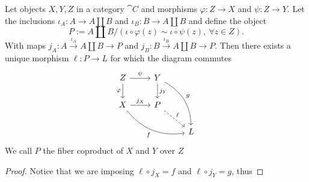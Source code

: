 \begin{proposition}
   Let objects \(X, Y, Z\) in a category \(\cat C\) and morphisms \(\varphi : Z
   \to X\) and \(\psi : Z \to Y\). Let the inclusions \(\iota_A : A \to A \amalg
   B\) and  \(\iota_B: B \to A \amalg B\) and define the object
    \[
       P := A \amalg B / (\iota \circ \varphi(z) \sim \iota \circ \psi(z),\
       \forall z \in Z).
   \]
   With maps \(j_A : A \xrightarrow{\iota_A} A \amalg B \to P\) and  \(j_B : B
   \xrightarrow{\iota_B} A \amalg B \to P\). Then there exists a unique morphism
    \(\ell : P \to L\) for which the diagram commutes
     \[
       \begin{tikzcd}
         Z
         \ar[r, "\psi"]
         \ar[d, swap, "\varphi"]
           &Y
           \ar[d, "j_Y"]
           \ar[ddr, bend left, "g"]
             &\\
         X
         \ar[r, "j_X"]
         \ar[drr, bend right, swap, "f"]
           &P
           \ar[dr, dashed, "\ell"]
             &\\
           &
             &L
       \end{tikzcd}
    \]
    We call \(P\) the fiber coproduct of \(X\) and \(Y\) over \(Z\)
\end{proposition}

\begin{proof}
   Notice that we are imposing \(\ell \circ j_X = f\) and \(\ell \circ j_Y =
   g\), thus
\end{proof}
